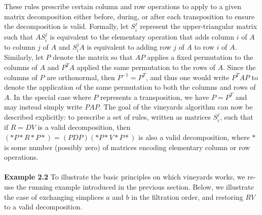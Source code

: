 \documentclass[sn-mathphys]{sn-jnl}
\begin{document}
These rules prescribe certain column and row operations to apply to a given matrix decomposition either before, during, or after each transposition to ensure the decomposition is valid.   
Formally, let $S_{i}^j$ represent the upper-triangular matrix such that $A S_{i}^j$ is equivalent to the elementary operation that adds column $i$ of $A$ to column $j$ of $A$ and $S_{i}^j A$ is equivalent to adding row $j$ of $A$ to row $i$ of $A$.
Similarly, let $P$ denote the matrix so that $A P$ applies a fixed permutation to the columns of $A$ and $P^T A$ applied the same permutation to the rows of $A$.
Since the columns of $P$ are orthonormal, then  $P^{-1} = P^T$, and thus one would write $P^T A P$ to denote the application of the same permutation to both the columns and rows of $A$. In the special case where $P$ represents a transposition, we have $P = P^T$ and may instead simply write $P A P$. 
The goal of the vineyards algorithm can now be described explicitly: to prescribe a set of rules, written as matrices $S_{i}^{j}$, such that if $R = D V$ is a valid decomposition, then $(\ast P \ast R \ast P \ast) = (PDP)(\ast P\ast V \ast P \ast)$ is also a valid decomposition, where $\ast$ is some number (possibly zero) of matrices encoding elementary column or row operations. 
\\
\\
\noindent 
\textbf{Example 2.2} To illustrate the basic principles on which vineyards works, we re-use the running example introduced in the previous section. Below, we illustrate the case of exchanging simplices $a$ and $b$ in the filtration order, and restoring $RV$ to a valid decomposition. 
\end{document}
